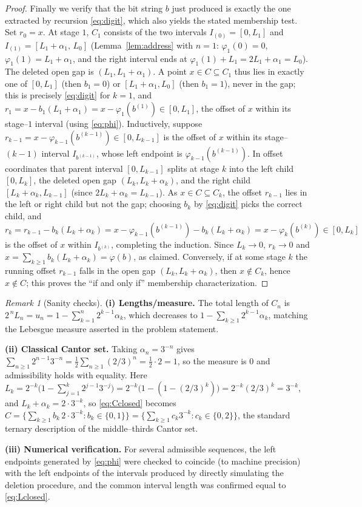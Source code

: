 \documentclass[11pt]{article}
\theoremstyle{definition}
\theoremstyle{remark}
\newtheorem{remark}{Remark}
\begin{document}
\begin{proof}
Finally we verify that the bit string $b$ just produced is exactly the one
extracted by recursion \eqref{eq:digit}, which also yields the stated membership
test. Set $r_0=x$. At stage $1$, $C_1$ consists of the two intervals
$I_{(0)}=[0,L_1]$ and $I_{(1)}=[L_1+\alpha_1,\,L_0]$
(Lemma~\ref{lem:address} with $n=1$: $\varphi_1(0)=0$,
$\varphi_1(1)=L_1+\alpha_1$, and the right interval ends at
$\varphi_1(1)+L_1=2L_1+\alpha_1=L_0$). The deleted open gap is
$(L_1,L_1+\alpha_1)$. A point $x\in C\subseteq C_1$ thus lies in exactly one of
$[0,L_1]$ (then $b_1=0$) or $[L_1+\alpha_1,L_0]$ (then $b_1=1$), never in the
gap; this is precisely \eqref{eq:digit} for $k=1$, and
$r_1=x-b_1(L_1+\alpha_1)=x-\varphi_1(b^{(1)})\in[0,L_1]$, the offset of $x$
within its stage--$1$ interval (using \eqref{eq:phi}). Inductively, suppose
$r_{k-1}=x-\varphi_{k-1}(b^{(k-1)})\in[0,L_{k-1}]$ is the offset of $x$ within its
stage--$(k-1)$ interval $I_{b^{(k-1)}}$, whose left endpoint is
$\varphi_{k-1}(b^{(k-1)})$. In offset coordinates that parent interval
$[0,L_{k-1}]$ splits at stage $k$ into the left child $[0,L_k]$, the deleted open
gap $(L_k,L_k+\alpha_k)$, and the right child $[L_k+\alpha_k,L_{k-1}]$ (since
$2L_k+\alpha_k=L_{k-1}$). As $x\in C\subseteq C_k$, the offset $r_{k-1}$ lies in
the left or right child but not the gap; choosing $b_k$ by \eqref{eq:digit} picks
the correct child, and
\[
r_k=r_{k-1}-b_k(L_k+\alpha_k)
   = x-\varphi_{k-1}(b^{(k-1)})-b_k(L_k+\alpha_k)
   = x-\varphi_k(b^{(k)})\in[0,L_k]
\]
is the offset of $x$ within $I_{b^{(k)}}$, completing the induction. Since
$L_k\to 0$, $r_k\to 0$ and $x=\sum_{k\ge1}b_k(L_k+\alpha_k)=\varphi(b)$, as
claimed. Conversely, if at some stage $k$ the running offset $r_{k-1}$ falls in
the open gap $(L_k,L_k+\alpha_k)$, then $x\notin C_k$, hence $x\notin C$; this
proves the ``if and only if'' membership characterization.
\end{proof}

\begin{remark}[Sanity checks]\label{rem:checks}
\textbf{(i) Lengths/measure.} The total length of $C_n$ is
$2^{\,n}L_n=u_n=1-\sum_{k=1}^{n}2^{k-1}\alpha_k$, which decreases to
$1-\sum_{k\ge1}2^{k-1}\alpha_k$, matching the Lebesgue measure asserted in the
problem statement.

\textbf{(ii) Classical Cantor set.} Taking $\alpha_n=3^{-n}$ gives
$\sum_{n\ge1}2^{n-1}3^{-n}=\tfrac12\sum_{n\ge1}(2/3)^n=\tfrac12\cdot 2=1$, so the
measure is $0$ and admissibility holds with equality. Here
$L_k=2^{-k}\bigl(1-\sum_{j=1}^{k}2^{j-1}3^{-j}\bigr)
     =2^{-k}\bigl(1-(1-(2/3)^k)\bigr)=2^{-k}(2/3)^k=3^{-k}$, and
$L_k+\alpha_k=2\cdot3^{-k}$, so \eqref{eq:Cclosed} becomes
$C=\{\sum_{k\ge1}b_k\,2\cdot3^{-k}:b_k\in\{0,1\}\}
   =\{\sum_{k\ge1}c_k 3^{-k}:c_k\in\{0,2\}\}$, the standard ternary
description of the middle--thirds Cantor set.

\textbf{(iii) Numerical verification.} For several admissible sequences, the left
endpoints generated by \eqref{eq:phi} were checked to coincide (to machine
precision) with the left endpoints of the intervals produced by directly
simulating the deletion procedure, and the common interval length was confirmed
equal to \eqref{eq:Lclosed}.
\end{remark}
\end{document}
